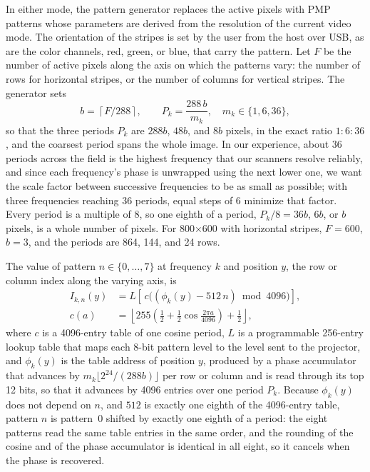 \documentclass[10pt,journal,compsoc]{IEEEtran}
\begin{document}
In either mode, the pattern generator replaces the active pixels with PMP patterns whose
parameters are derived from the resolution of the current video mode. The orientation of the
stripes is set by the user from the host over USB, as are the color channels, red, green, or
blue, that carry the pattern. Let $F$ be the number of active
pixels along the axis on which the patterns vary: the number of rows for horizontal stripes, or
the number of columns for vertical stripes. The generator sets
\begin{equation}
b = \left\lceil F/288 \right\rceil, \qquad P_k = \frac{288\,b}{m_k}, \quad m_k \in \{1, 6, 36\},
\label{eq:periods}
\end{equation}
so that the three periods $P_k$ are $288b$, $48b$, and $8b$ pixels, in the exact ratio
$1{:}6{:}36$, and the coarsest period spans the whole image. In our experience, about 36
periods across the field is the highest frequency that our scanners resolve reliably, and since
each frequency's phase is unwrapped using the next lower one, we want the scale factor between
successive frequencies to be as small as possible; with three frequencies reaching 36 periods,
equal steps of 6 minimize that factor. Every period is a multiple of 8, so
one eighth of a period, $P_k/8 = 36b$, $6b$, or $b$ pixels, is a whole number of pixels. For
800$\times$600 with horizontal stripes, $F=600$, $b=3$, and the periods are 864, 144, and 24 rows.

The value of pattern $n \in \{0,\ldots,7\}$ at frequency $k$ and position $y$, the row or column index along the varying axis, is
\begin{align}
I_{k,n}(y) &= L\!\left[\,c\big((\phi_k(y) - 512\,n) \bmod 4096\big)\right], \label{eq:pattern}\\
c(a) &= \left\lfloor 255\left(\tfrac12 + \tfrac12 \cos\tfrac{2\pi a}{4096}\right) + \tfrac12 \right\rfloor, \nonumber
\end{align}
where $c$ is a 4096-entry table of one cosine period, $L$ is a programmable 256-entry lookup
table that maps each 8-bit pattern level to the level sent to the projector, and $\phi_k(y)$ is the
table address of position $y$, produced by a phase accumulator that advances by
$m_k\lfloor 2^{24}/(288b) \rfloor$ per row or column and is read through its top 12 bits, so that it
advances by 4096 entries over one period $P_k$. Because $\phi_k(y)$ does not depend on $n$, and
$512$ is exactly one eighth of the 4096-entry table, pattern $n$ is pattern~0 shifted by exactly
one eighth of a period: the eight patterns read the same table entries in the same order, and
the rounding of the cosine and of the phase accumulator is identical in all eight, so it cancels
when the phase is recovered.
\end{document}
